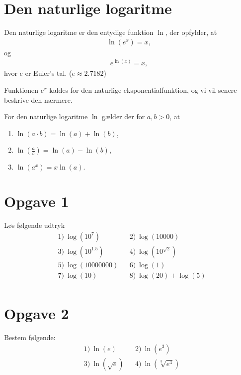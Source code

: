 \section*{Den naturlige logaritme}
\begin{defn}
Den naturlige logaritme er den entydige funktion $\ln$, der opfylder, at
\begin{align*}
\ln(e^x) = x, 
\end{align*}
og
\begin{align*}
e^{\ln(x)} = x,
\end{align*}
hvor $e$ er Euler's tal. ($e \approx 2.7182$)
\end{defn}
Funktionen $e^x$ kaldes for den naturlige eksponentialfunktion, og vi vil senere beskrive den nærmere.

\begin{setn}
For den naturlige logaritme $\ln$ gælder der for $a,b>0$, at
\begin{enumerate}[label=\roman*)]
\item $\ln(a\cdot b) = \ln(a) + \ln(b)$,
\item $\ln(\frac{a}{b}) = \ln(a)-\ln(b)$,
\item $\ln(a^x) = x\ln(a)$.
\end{enumerate}
\end{setn}


\section*{Opgave 1}
Løs følgende udtryk
\begin{align*}
	&1) \ \log(10^7)    &&2) \ \log(10000)   \\  
	&3) \ \log(10^{1.5})   &&4) \ \log(10^{\sqrt{2}})     \\  
	&5) \ \log(10000000)   &&6) \ \log(1)   \\  
	&7) \  \log(10)  &&8) \ \log(20)+ \log(5)   \\   
\end{align*}

\section*{Opgave 2}
Bestem følgende:
\begin{align*}
&1) \  \ln(e)  &&2) \  \ln(e^3)    \\
&3) \  \ln(\sqrt{e})  &&4) \ \ln(\sqrt[5]{e^4})      \\
\end{align*}

